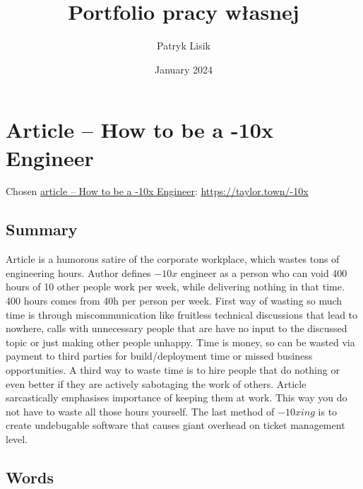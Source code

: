 \documentclass[13pt,twoside,a4paper]{article}
\begin{document}
\title{Portfolio pracy własnej}
\author{Patryk Lisik}
\date{January 2024}
\maketitle

\section*{Article -- How to be a -10x Engineer} 
Chosen \href{https://taylor.town/-10x}{article -- How to be a -10x Engineer}: \href{https://taylor.town/-10x}{\url{https://taylor.town/-10x}}

\subsection*{Summary}

Article is a humorous satire of the corporate workplace, which wastes tons of engineering hours.
Author defines $-10x$ engineer as a person who can void 400 hours of 10 other people work per week, while
delivering nothing in that time.
400 hours comes from 40h per person per week.
First way of wasting so much time is through miscommunication like fruitless technical discussions that lead to nowhere,
    calls with unnecessary people that are have no input to the discussed topic or just making other people unhappy.
Time is money, so can be wasted via payment to third parties for build/deployment time or missed business opportunities.
A third way to waste time is to hire people that do nothing or even better if they are actively sabotaging the work of others.
Article sarcastically emphasises importance of keeping them at work.
This way you do not have to waste all those hours yourself. 
The last method of $-10xing$ is to create undebugable software that causes giant overhead on ticket management level. 

\subsection*{Words}
\end{document}
